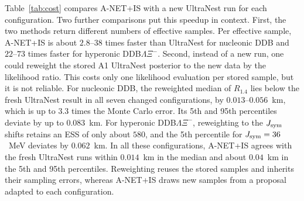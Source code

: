 \documentclass[aps,prd,twocolumn,superscriptaddress,nofootinbib,longbibliography]{revtex4-2}
\begin{document}
Table~\ref{tab:cost} compares A-NET+IS with a new UltraNest run for each
configuration. Two further comparisons put this speedup in context. First, the two
methods return different numbers of effective samples. Per effective sample,
A-NET+IS is about $2.8$--$38$ times faster than UltraNest for nucleonic DDB and
$22$--$73$ times faster for hyperonic DDB$\Lambda\Xi^-$. Second, instead of a new
run, one could reweight the stored A1 UltraNest posterior to the new data by the
likelihood ratio. This costs only one likelihood evaluation per stored sample, but
it is not reliable. For nucleonic DDB, the reweighted median of $R_{1.4}$ lies
below the fresh UltraNest result in all seven changed configurations, by
$0.013$--$0.056$~km, which is up to $3.3$ times the Monte Carlo error. Its 5th and
95th percentiles deviate by up to $0.083$~km. For hyperonic DDB$\Lambda\Xi^-$,
reweighting to the $J_{\rm sym}$ shifts retains an ESS of only about $580$, and the
5th percentile for $J_{\rm sym}=36$~MeV deviates by $0.062$~km. In all these
configurations, A-NET+IS agrees with the fresh UltraNest runs within $0.014$~km in
the median and about $0.04$~km in the 5th and 95th percentiles. Reweighting reuses
the stored samples and inherits their sampling errors, whereas A-NET+IS draws new
samples from a proposal adapted to each configuration.
\end{document}
